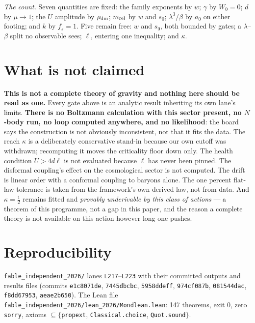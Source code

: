 \documentclass[11pt,letterpaper]{article}
\begin{document}
\emph{The count.} Seven quantities are fixed: the family exponents by $w$; $\gamma$ by $W_0=0$; $d$ by $\mu\to1$; the $U$ amplitude by $\rho_{\rm dm}$; $m_{\rm rel}$ by $w$ and $s_0$; $\lambda^3/\beta$ by $a_0$ on either footing; and $k$ by $f_s=1$. Five remain free: $w$ and $s_0$, both bounded by gates; a $\lambda$--$\beta$ split no observable sees; $\ell$, entering one inequality; and $\kappa$.

\section{What is not claimed}
\textbf{This is not a complete theory of gravity and nothing here should be read as one.} Every gate above is an analytic result inheriting its own lane's limits. \textbf{There is no Boltzmann calculation with this sector present, no $N$-body run, no loop computed anywhere, and no likelihood}: the board says the construction is not obviously inconsistent, not that it fits the data. The reach $\kappa$ is a deliberately conservative stand-in because our own cutoff was withdrawn; recomputing it moves the criticality floor down only. The health condition $U>4d\ell$ is not evaluated because $\ell$ has never been pinned. The disformal coupling's effect on the cosmological sector is not computed. The drift is linear order with a conformal coupling to baryons alone. The one percent flat-law tolerance is taken from the framework's own derived law, not from data. And $\kappa=\tfrac12$ remains fitted and \emph{provably underivable by this class of actions} \cite{repo} --- a theorem of this programme, not a gap in this paper, and the reason a complete theory is not available on this action however long one pushes.

\section{Reproducibility}
\texttt{fable\_independent\_2026/} lanes \texttt{L217}--\texttt{L223} with their committed outputs and results files (commits \texttt{e1c8071de}, \texttt{7445dbcbc}, \texttt{5958ddeff}, \texttt{974cf087b}, \texttt{081544dac}, \texttt{f8dd67953}, \texttt{aeae2b650}). The Lean file \texttt{fable\_independent\_2026/lean\_2026/Mondlean.lean}: 147 theorems, exit 0, zero \texttt{sorry}, axioms $\subseteq\{$\texttt{propext}, \texttt{Classical.choice}, \texttt{Quot.sound}$\}$.
\end{document}
